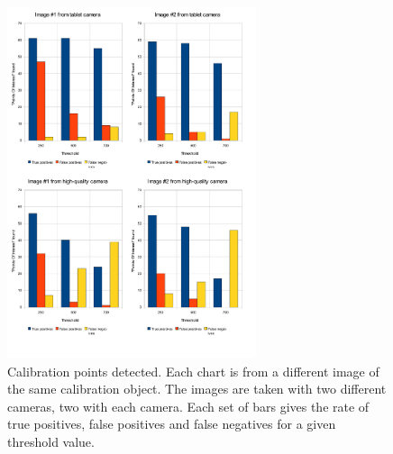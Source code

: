 \begin{figure}[h]
  \centering
  \includegraphics[width=0.65\textwidth]{figures/calibration-auto}
  \caption[Calibration point detection]{Calibration points detected. Each chart is from a different image of
    the same calibration object. The images are taken with two
    different cameras, two with each camera. Each set of bars gives the rate of true positives, false positives and false negatives for a given threshold value.}
  \label{fig:calib-auto}
\end{figure}
